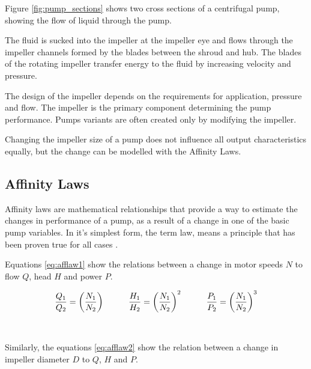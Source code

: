 Figure \ref{fig:pump_sections} shows two cross sections of a centrifugal pump,
showing the flow of liquid through the pump.
\newpage

The fluid is sucked into the impeller at the impeller eye and flows through
the impeller channels formed by the blades between the shroud and hub.
The blades of the rotating impeller transfer energy to the fluid by
increasing velocity and pressure. \cite{CentrifugalPump}

The design of the impeller depends on the requirements for application,
pressure and flow. The impeller is the primary component determining the pump performance. 
Pumps variants are often created only by modifying the impeller.

Changing the impeller size of a pump does not influence all output characteristics equally,
but the change can be modelled with the Affinity Laws.

\subsection{Affinity Laws}\label{sub:afflaws}
Affinity laws are mathematical relationships that provide a way to estimate the 
changes in performance of a pump, as a result of a change in one of the basic pump variables.
In it's simplest form, the term law, means a principle that has been proven true for all cases \cite{Bachus2003}.

Equations \ref{eq:afflaw1} show the relations between a change in motor speeds $N$
to flow $Q$, head $H$ and power $P$.

\begin{equation}
	\frac{Q_1}{Q_2} = \left(\frac{N_1}{N_2}\right)
	\hspace{10mm}
	\frac{H_1}{H_2} = \left(\frac{N_1}{N_2}\right)^2
	\hspace{10mm}
	\frac{P_1}{P_2} = \left(\frac{N_1}{N_2}\right)^3
	\label{eq:afflaw1}
\end{equation}
\cite{Volk2014}\\\\
Similarly, the equations \ref{eq:afflaw2} show the relation between a change in impeller diameter $D$
to  $Q$, $H$ and $P$.

